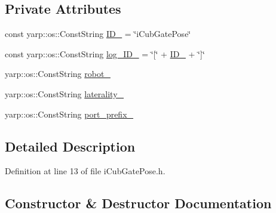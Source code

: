 \subsection*{Private Attributes}
\begin{DoxyCompactItemize}
\item 
const yarp\+::os\+::\+Const\+String \hyperlink{classiCubGatePose_a2e70b20ff45c269bfb6a339792f51fd0}{I\+D\+\_\+} = \char`\"{}i\+Cub\+Gate\+Pose\char`\"{}
\item 
const yarp\+::os\+::\+Const\+String \hyperlink{classiCubGatePose_a79abca8331a8c99fcf05e44e681fe067}{log\+\_\+\+I\+D\+\_\+} = \char`\"{}\mbox{[}\char`\"{} + \hyperlink{classiCubGatePose_a2e70b20ff45c269bfb6a339792f51fd0}{I\+D\+\_\+} + \char`\"{}\mbox{]}\char`\"{}
\item 
yarp\+::os\+::\+Const\+String \hyperlink{classiCubGatePose_a15e5113dc88ac3b411eaa33d60378b66}{robot\+\_\+}
\item 
yarp\+::os\+::\+Const\+String \hyperlink{classiCubGatePose_a738def17b96e37617d7a7ca9365bae6d}{laterality\+\_\+}
\item 
yarp\+::os\+::\+Const\+String \hyperlink{classiCubGatePose_a2e319d826c8683417b96d691f9d5fa58}{port\+\_\+prefix\+\_\+}
\end{DoxyCompactItemize}


\subsection{Detailed Description}


Definition at line 13 of file i\+Cub\+Gate\+Pose.\+h.



\subsection{Constructor \& Destructor Documentation}
\mbox{\label{classiCubGatePose_a3c06ef47eb5a0ccb0500828829fa3c31}} 
